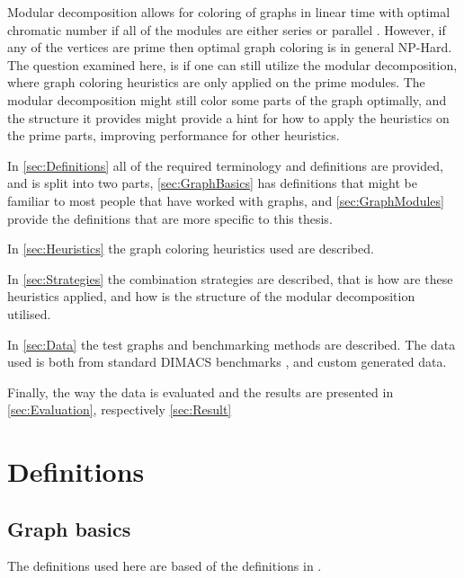 \documentclass[a4paper]{article}
\begin{document}
Modular decomposition allows for coloring of graphs in linear time with optimal
chromatic number if all of the modules are either  series or parallel
\cite{HCL}. However, if any of the vertices are prime then optimal graph
coloring is in general NP-Hard\cite{NPHard}. The question examined here, is if
one can still utilize the modular decomposition, where graph coloring heuristics
are only applied on the prime modules. The modular decomposition might still color some parts
of the graph optimally, and the structure it provides might provide a hint for
how to apply the heuristics on the prime parts, improving performance for other
heuristics.

In \autoref{sec:Definitions} all of the required terminology and definitions are
provided, and is split into two parts, \autoref{sec:GraphBasics} has definitions that might be
familiar to most people that have worked with graphs, and
\autoref{sec:GraphModules} provide the definitions that are more specific to
this thesis.

In \autoref{sec:Heuristics} the graph coloring heuristics used are described.

In \autoref{sec:Strategies} the combination strategies are described, that is how are
these heuristics applied, and how is the structure of the modular decomposition
utilised.

In \autoref{sec:Data} the test graphs and benchmarking methods are described. The data
used is both from standard DIMACS benchmarks \cite{DIMACS}, and custom generated data.

Finally, the way the data is evaluated and the results are presented in 
\autoref{sec:Evaluation}, respectively \autoref{sec:Result}

\section{Definitions}
\label{sec:Definitions}

\subsection{Graph basics}
\label{sec:GraphBasics}

The definitions used here are based of the definitions in \cite{GraphBasics}. 
\end{document}
